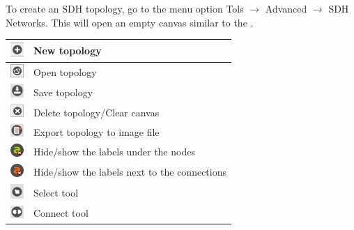 \documentclass[a4paper]{article}
\begin{document}
		\newpage
		To create an SDH topology, go to the menu option Tols $\rightarrow$ Advanced $\rightarrow$ SDH Networks. This will open an empty canvas similar to the .
		\begin{table}[h!]
			\centering
			\begin{tabular}{lp{10cm}}
				\includegraphics[width=0.5cm]{img/icon_new_element.png} & New topology \\
				\midrule
				\includegraphics[width=0.5cm]{img/icon_open.png} & Open topology \\
				\midrule
				\includegraphics[width=0.5cm]{img/icon_save.png} & Save topology \\
				\midrule
				\includegraphics[width=0.5cm]{img/icon_delete.png} & Delete topology/Clear canvas \\
				\midrule
				\includegraphics[width=0.5cm]{img/icon_export.png} & Export topology to image file \\
				\midrule
				\includegraphics[width=0.5cm]{img/icon_toggle_node_labels.png} & Hide/show the labels under the nodes\\
				\midrule
				\includegraphics[width=0.5cm]{img/icon_toggle_conn_labels.png} & Hide/show the labels next to the connections\\
				\midrule
				\includegraphics[width=0.5cm]{img/icon_select_tool.png} & Select tool \\
				\midrule
				\includegraphics[width=0.5cm]{img/icon_connect_tool.png} & Connect tool \\

\end{tabular}
\end{table}
\end{document}
